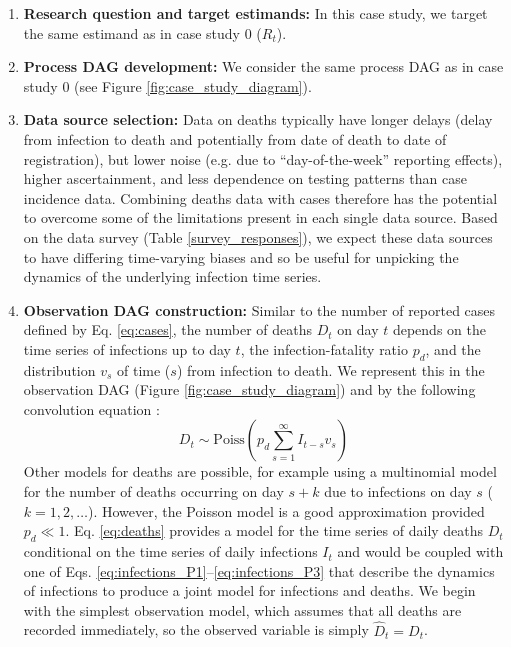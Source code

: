 \documentclass{article}
\begin{document}
\begin{enumerate}
   \item \textbf{Research question and target estimands:}  In this case study, we target the same estimand as in case study 0 ($R_t$). 
   
    \item \textbf{Process DAG development:} We consider the same process DAG as in case study 0 (see Figure \ref{fig:case_study_diagram}).
        
    \item \textbf{Data source selection:} Data on deaths typically have longer delays (delay from infection to death and potentially from date of death to date of registration), but lower noise (e.g. due to ``day-of-the-week'' reporting effects), higher ascertainment, and less dependence on testing patterns than case incidence data. Combining deaths data with cases therefore has the potential to overcome some of the limitations present in each single data source. Based on the data survey (Table \ref{survey_responses}), we expect these data sources to have differing time-varying biases and so be useful for unpicking the dynamics of the underlying infection time series.
    
    \item \textbf{Observation DAG construction:} Similar to the number of reported cases defined by Eq. \eqref{eq:cases}, the number of deaths $D_t$ on day $t$ depends on the time series of infections up to day $t$, the infection-fatality ratio $p_d$, and the distribution $v_s$ of time ($s$) from infection to death. We represent this in the observation DAG (Figure \ref{fig:case_study_diagram}) and by the following convolution equation \citep{bhatt2023semi}:
    \begin{equation} \label{eq:deaths}
        D_t \sim \mathrm{Poiss}\left(p_d \sum_{s=1}^\infty I_{t-s}v_s \right)
    \end{equation}
    Other models for deaths are possible, for example using a multinomial model for the number of deaths occurring on day $s+k$ due to infections on day $s$ ($k=1,2,\ldots$). However, the Poisson model is a good approximation provided $p_d\ll 1$. 
    Eq. \eqref{eq:deaths} provides a model for the time series of daily deaths $D_t$ conditional on the time series of daily infections $I_t$ and would be coupled with one of Eqs. \eqref{eq:infections_P1}--\eqref{eq:infections_P3} that describe the dynamics of infections to produce a joint model for infections and deaths. We begin with the simplest observation model, which assumes that all deaths are recorded immediately, so the observed variable is simply $\hat{D}_t=D_t$.
    



\end{enumerate}
\end{document}
